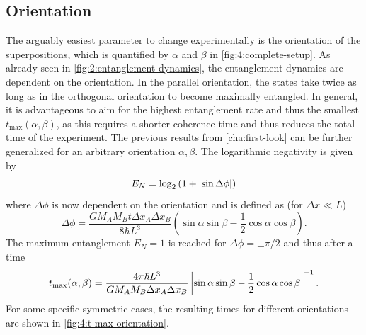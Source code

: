 \subsection{Orientation}
The arguably easiest parameter to change experimentally is the orientation of the superpositions, which is quantified by $\alpha$ and $\beta$ in \cref{fig:4:complete-setup}.
As already seen in \cref{fig:2:entanglement-dynamics}, the entanglement dynamics are dependent on the orientation.
In the parallel orientation, the states take twice as long as in the orthogonal orientation to become maximally entangled.
In general, it is advantageous to aim for the highest entanglement rate and thus the smallest $t_\mathrm{max}(\alpha, \beta)$, as this requires a shorter coherence time and thus reduces the total time of the experiment.
The previous results from \cref{cha:first-look} can be further generalized for an arbitrary orientation $\alpha, \beta$. The logarithmic negativity is given by
\begin{equation}
  E_N = \log_2\left(1+\left\lvert\sin\Delta\phi\right\rvert\right)
\end{equation}
where $\Delta\phi$ is now dependent on the orientation and is defined as (for $\Delta x \ll L$)
\begin{equation}
  \Delta \phi = \frac{G M_A M_B t \Delta x_A \Delta x_B}{8\hbar L^3} \left(\sin\alpha\sin\beta-\frac{1}{2}\cos\alpha\cos\beta\right) .
\end{equation}
The maximum entanglement $E_N=1$ is reached for $\Delta\phi = \pm \pi/2$ and thus after a time
\begin{equation}\label{eq:4:t-max}
  t_\mathrm{max}(\alpha,\beta) = \frac{4\pi \hbar L^3}{G M_A M_B \Delta x_A \Delta x_B}\left\lvert\sin\alpha\sin\beta - \frac{1}{2}\cos\alpha\cos\beta\right\rvert^{-1}.
\end{equation}
For some specific symmetric cases, the resulting times for different orientations are shown in \cref{fig:4:t-max-orientation}.
